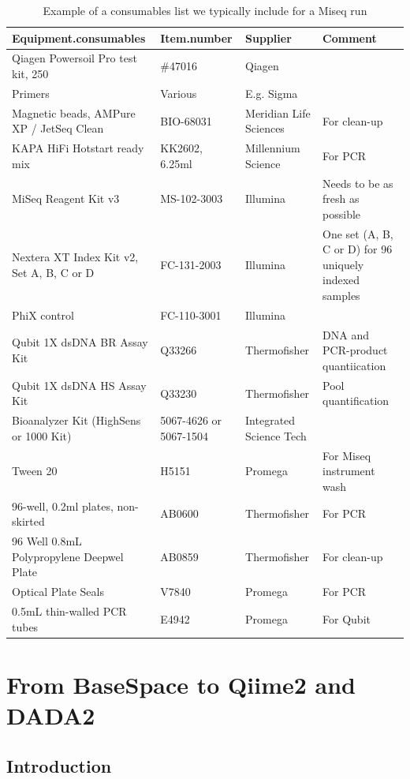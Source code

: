 \documentclass[
]{book}
\begin{document}
\begin{table}

\caption{\label{tab:consumables}Example of a consumables list we typically include for a Miseq run}
\centering
\begin{tabular}[t]{llll}
\toprule
Equipment.consumables & Item.number & Supplier & Comment\\
\midrule
Qiagen Powersoil Pro test kit, 250 & \#47016 & Qiagen & \\
Primers & Various & E.g. Sigma & \\
Magnetic beads,  AMPure XP / JetSeq Clean & BIO-68031 & Meridian Life Sciences & For clean-up\\
KAPA HiFi Hotstart ready mix & KK2602, 6.25ml & Millennium Science & For PCR\\
MiSeq Reagent Kit v3 & MS-102-3003 & Illumina & Needs to be as fresh as possible\\
\addlinespace
Nextera XT Index Kit v2, Set A, B, C or D & FC-131-2003 & Illumina & One set (A, B, C or D) for 96 uniquely  indexed samples\\
PhiX control & FC-110-3001 & Illumina & \\
Qubit 1X dsDNA BR Assay Kit & Q33266 & Thermofisher & DNA and PCR-product quantiication\\
Qubit 1X dsDNA HS Assay Kit & Q33230 & Thermofisher & Pool quantification\\
Bioanalyzer Kit (HighSens or 1000 Kit) & 5067-4626 or 5067-1504 & Integrated Science Tech & \\
\addlinespace
Tween 20 & H5151 & Promega & For Miseq instrument wash\\
96-well, 0.2ml plates, non-skirted & AB0600 & Thermofisher & For PCR\\
96 Well 0.8mL Polypropylene Deepwel Plate & AB0859 & Thermofisher & For clean-up\\
Optical Plate Seals & V7840 & Promega & For PCR\\
0.5mL thin-walled PCR tubes & E4942 & Promega & For Qubit\\
\bottomrule
\end{tabular}
\end{table}

\hypertarget{miseqtoqiime}{%
\chapter{From BaseSpace to Qiime2 and DADA2}\label{miseqtoqiime}}

\hypertarget{introduction-1}{%
\section{Introduction}\label{introduction-1}}
\end{document}
